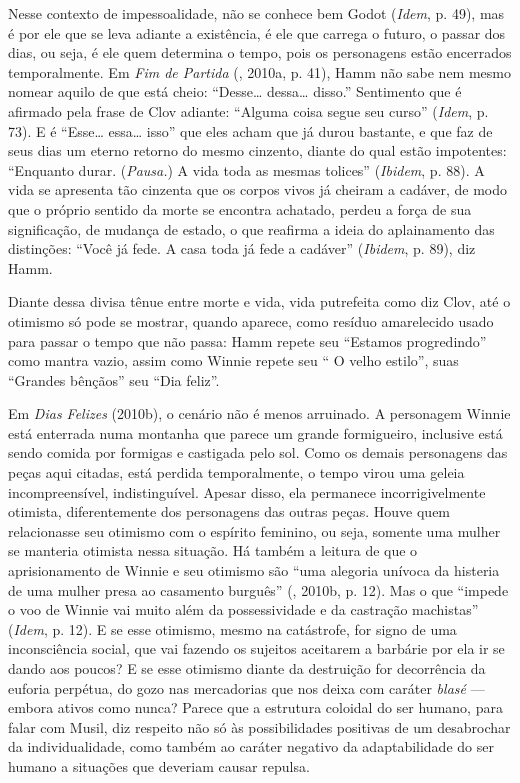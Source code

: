 Nesse contexto de impessoalidade, não se conhece bem Godot (\emph{Idem},
p. 49), mas é por ele que se leva adiante a existência, é ele que
carrega o futuro, o passar dos dias, ou seja, é ele quem determina o
tempo, pois os personagens estão encerrados temporalmente. Em \emph{Fim
de Partida} (, 2010a, p. 41), Hamm não sabe nem mesmo nomear
aquilo de que está cheio: ``Desse\ldots{} dessa\ldots{} disso.'' Sentimento que é
afirmado pela frase de Clov adiante: ``Alguma coisa segue seu curso''
(\emph{Idem}, p. 73). E é ``Esse\ldots{} essa\ldots{} isso'' que eles acham que já
durou bastante, e que faz de seus dias um eterno retorno do mesmo
cinzento, diante do qual estão impotentes: ``Enquanto durar.
(\emph{Pausa.}) A vida toda as mesmas tolices'' (\emph{Ibidem}, p. 88). A
vida se apresenta tão cinzenta que os corpos vivos já cheiram a cadáver,
de modo que o próprio sentido da morte se encontra achatado, perdeu a
força de sua significação, de mudança de estado, o que reafirma a ideia
do aplainamento das distinções: ``Você já fede. A casa toda já fede a
cadáver'' (\emph{Ibidem}, p. 89), diz Hamm.

Diante dessa divisa tênue entre morte e vida, vida putrefeita como diz
Clov, até o otimismo só pode se mostrar, quando aparece, como resíduo
amarelecido usado para passar o tempo que não passa: Hamm repete seu
``Estamos progredindo'' como mantra vazio, assim como Winnie repete seu
`` O velho estilo'', suas ``Grandes bênçãos'' seu ``Dia feliz''.

Em \emph{Dias Felizes} (2010b), o cenário não é menos arruinado.
A personagem Winnie está enterrada numa montanha que parece um grande
formigueiro, inclusive está sendo comida por formigas e castigada pelo
sol. Como os demais personagens das peças aqui citadas, está perdida
temporalmente, o tempo virou uma geleia incompreensível, indistinguível.
Apesar disso, ela permanece incorrigivelmente otimista, diferentemente
dos personagens das outras peças. Houve quem relacionasse seu otimismo com o
espírito feminino, ou seja, somente uma mulher se manteria otimista
nessa situação. Há também a leitura de que o aprisionamento de Winnie e
seu otimismo são ``uma alegoria unívoca da histeria de uma mulher presa
ao casamento burguês'' (, 2010b, p. 12). Mas o que ``impede o
voo de Winnie vai muito além da possessividade e da castração
machistas'' (\emph{Idem}, p. 12). E se esse otimismo, mesmo na
catástrofe, for signo de uma inconsciência social, que vai fazendo os
sujeitos aceitarem a barbárie por ela ir se dando aos poucos? E se esse
otimismo diante da destruição for decorrência da euforia perpétua, do
gozo nas mercadorias que nos deixa com caráter \emph{blasé} --- embora
ativos como nunca? Parece que a estrutura coloidal do ser humano, para
falar com Musil, diz respeito não só às possibilidades positivas de um
desabrochar da individualidade, como também ao caráter negativo da
adaptabilidade do ser humano a situações que deveriam causar repulsa.


